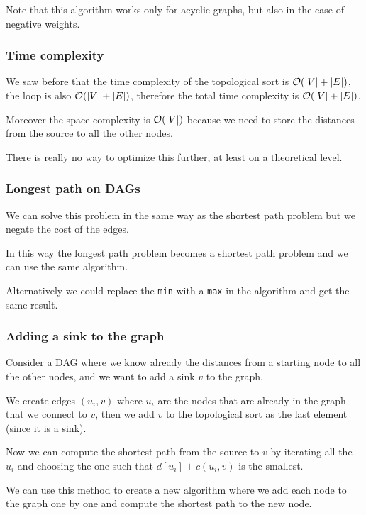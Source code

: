 \documentclass[12pt]{extarticle}
\begin{document}
Note that this algorithm works only for acyclic graphs, but also in the case of negative weights.

\subsubsection{Time complexity}

We saw before that the time complexity of the topological sort is $\mathcal{O}(|V| + |E|)$, the loop is also $\mathcal{O}(|V| + |E|)$, therefore the total time complexity is $\mathcal{O}(|V| + |E|)$.

Moreover the space complexity is $\mathcal{O}(|V|)$ because we need to store the distances from the source to all the other nodes.

There is really no way to optimize this further, at least on a theoretical level.

\subsubsection{Longest path on DAGs}

We can solve this problem in the same way as the shortest path problem but we negate the cost of the edges.

In this way the longest path problem becomes a shortest path problem and we can use the same algorithm.

Alternatively we could replace the \texttt{min} with a \texttt{max} in the algorithm and get the same result.

\subsubsection{Adding a sink to the graph}

Consider a DAG where we know already the distances from a starting node to all the other nodes, and we want to add a sink $v$ to the graph.

We create edges $(u_i, v)$ where $u_i$ are the nodes that are already in the graph that we connect to $v$, then we add $v$ to the topological sort as the last element (since it is a sink).

Now we can compute the shortest path from the source to $v$ by iterating all the $u_i$ and choosing the one such that $d[u_i] + c(u_i, v)$ is the smallest.

We can use this method to create a new algorithm where we add each node to the graph one by one and compute the shortest path to the new node.
\end{document}
